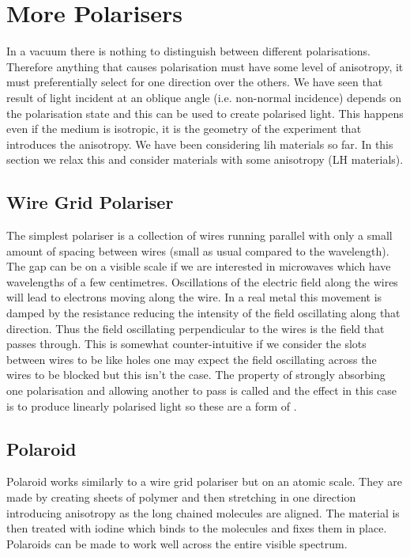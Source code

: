     \section{More Polarisers}
    In a vacuum there is nothing to distinguish between different polarisations.
    Therefore anything that causes polarisation must have some level of anisotropy, it must preferentially select for one direction over the others.
    We have seen that result of light incident at an oblique angle (i.e. non-normal incidence) depends on the polarisation state and this can be used to create polarised light.
    This happens even if the medium is isotropic, it is the geometry of the experiment that introduces the anisotropy.
    We have been considering \gls{lih} materials so far.
    In this section we relax this and consider materials with some anisotropy (LH materials).
    
    \subsection{Wire Grid Polariser}
    The simplest polariser is a collection of wires running parallel with only a small amount of spacing between wires (small as usual compared to the wavelength).
    The gap can be on a visible scale if we are interested in microwaves which have wavelengths of a few centimetres.
    Oscillations of the electric field along the wires will lead to electrons moving along the wire.
    In a real metal this movement is damped by the resistance reducing the intensity of the field oscillating along that direction.
    Thus the field oscillating perpendicular to the wires is the field that passes through.
    This is somewhat counter-intuitive if we consider the slots between wires to be like holes one may expect the field oscillating across the wires to be blocked but this isn't the case.
    The property of strongly absorbing one polarisation and allowing another to pass is called  and the effect in this case is to produce linearly polarised light so these are a form of .
    
    \subsection{Polaroid}
    Polaroid works similarly to a wire grid polariser but on an atomic scale.
    They are made by creating sheets of polymer and then stretching in one direction introducing anisotropy as the long chained molecules are aligned.
    The material is then treated with iodine which binds to the molecules and fixes them in place.
    Polaroids can be made to work well across the entire visible spectrum.
    

